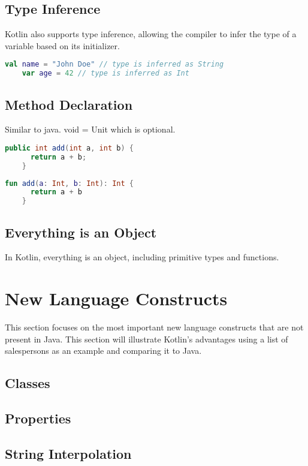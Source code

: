 \documentclass[a4paper, 11pt]{article}
\begin{document}
\subsection{Type Inference}
  Kotlin also supports type inference, allowing the compiler to infer the type of a variable based on its initializer.
  \begin{lstlisting}[language=Kotlin]
    val name = "John Doe" // type is inferred as String
    var age = 42 // type is inferred as Int
  \end{lstlisting}

\subsection{Method Declaration}
  Similar to java. void = Unit which is optional.
  \begin{lstlisting}[language=Java,title={Java method declaration}]
    public int add(int a, int b) {
      return a + b;
    }
  \end{lstlisting}
  \begin{lstlisting}[language=Kotlin,title={Kotlin method declaration}]
    fun add(a: Int, b: Int): Int {
      return a + b
    }
  \end{lstlisting}

\subsection{Everything is an Object}
  In Kotlin, everything is an object, including primitive types and functions.

\section{New Language Constructs}
  This section focuses on the most important new language constructs that are not present in Java. 
  This section will illustrate Kotlin's advantages using a list of salespersons as an example and comparing it to Java.
\subsection{Classes}
\subsection{Properties}
\subsection{String Interpolation}
\end{document}
